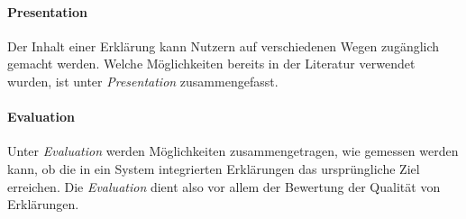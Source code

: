 \paragraph{Presentation} Der Inhalt einer Erklärung kann Nutzern auf verschiedenen Wegen zugänglich gemacht werden. Welche Möglichkeiten bereits in der Literatur verwendet wurden, ist unter \textit{Presentation} zusammengefasst.

\paragraph{Evaluation} Unter \textit{Evaluation} werden Möglichkeiten zusammengetragen, wie gemessen werden kann, ob die in ein System integrierten Erklärungen das ursprüngliche Ziel erreichen. Die \textit{Evaluation} dient also vor allem der Bewertung der Qualität von Erklärungen.







